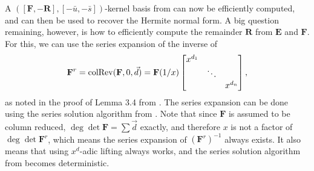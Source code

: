 A $\left(\left[\mathbf{F},-\mathbf{R}\right],\left[-\bar{u},-\bar{s}\right]\right)$-kernel
basis from  can now be efficiently
computed, and can then be used to recover the Hermite normal form.
A big question remaining, however, is how to efficiently compute the
remainder $\mathbf{R}$ from $\mathbf{E}$ and $\mathbf{F}$. For
this, we can use the series expansion of the inverse of 
\[
\mathbf{F}^{r}=\operatorname{colRev}(\mathbf{F},0,\vec{d})=\mathbf{F}(1/x)\begin{bmatrix}x^{d_{1}}\\
 & \ddots\\
 &  & x^{d_{n}}
\end{bmatrix},
\]
 as noted in the proof of Lemma 3.4 from \citep{Giorgi2003}. The
series expansion can be done using the series solution algorithm from
\citet{storjohann:2003}. Note that since $\mathbf{F}$ is assumed
to be column reduced, $\deg\det\mathbf{F}=\sum\vec{d}$ exactly, and
therefore $x$ is not a factor of $\deg\det\mathbf{F}^{r}$, which
means the series expansion of $\left(\mathbf{F}^{r}\right)^{-1}$
always exists. It also means that using $x^{d}$-adic lifting always
works, and the series solution algorithm from \citet{storjohann:2003}
becomes deterministic. 

